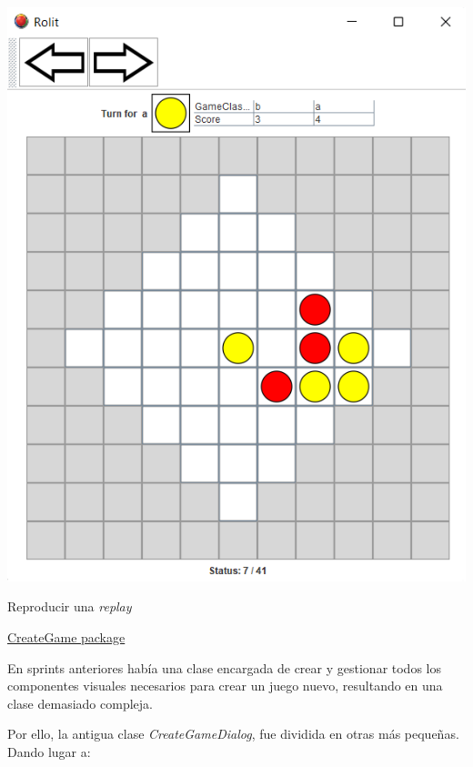 \documentclass[../DocumentoOficial.tex]{subfiles}
\begin{document}
\begin{sprint}[6]
\begin{center}
\includegraphics[scale=1]{replay-sprint-6.png}

Reproducir una \textit{replay}
\end{center}

\underline{CreateGame package}

En sprints anteriores había una clase encargada de crear y gestionar todos los componentes visuales necesarios para crear un juego nuevo, resultando en una clase demasiado compleja.

Por ello, la antigua clase \textit{CreateGameDialog}, fue dividida en otras más pequeñas. Dando lugar a:


\end{sprint}
\end{document}

